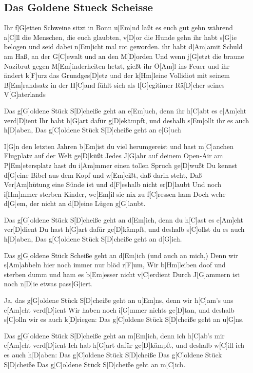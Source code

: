 \subsection*{Das Goldene Stueck Scheisse   }
\begin{guitar}
Ihr f[G]etten Schweine sitzt in Bonn u[Em]nd laßt es euch gut gehn
während a[C]ll die Menschen, die euch glaubten, v[D]or die Hunde gehn
ihr habt s[G]ie belogen und seid dabei n[Em]icht mal rot geworden.
ihr habt d[Am]amit Schuld am Haß, an der G[C]ewalt und an den M[D]orden
Und wenn j[G]etzt die braune Nazibrut gegen M[Em]inderheiten hetzt,
gießt ihr \"O[Am]l ins Feuer und ihr \"andert k[F]urz das Grundges[D]etz
und der k[Hm]leine Vollidiot mit seinem B[Em]randsatz in der H[C]and
fühlt sich als l[G]egitimer R\"a[D]cher seines V[G]aterlands

Das g[G]oldene St\"uck S[D]cheiße geht an e[Em]uch, denn ihr h[C]abt es e[Am]cht verd[D]ient
Ihr habt h[G]art dafür g[D]ek\"ampft, und deshalb s[Em]ollt ihr es auch h[D]aben,
Das g[C]oldene St\"uck S[D]cheiße geht an e[G]uch

I[G]n den letzten Jahren b[Em]ist du viel herumgereist
und hast m[C]anchen Flugplatz auf der Welt ge[D]k\"ußt
Jedes J[G]ahr auf deinem Open-Air am P[Em]etersplatz
hast du i[Am]mmer einen tollen Spruch ge[D]wußt
Du kennst d[G]eine Bibel aus dem Kopf und w[Em]eißt, daß darin steht,
Daß Ver[Am]h\"utung eine Sünde ist und d[F]eshalb nicht er[D]laubt
Und noch i[Hm]mmer sterben Kinder, we[Em]il sie nix zu f[C]ressen ham
Doch wehe d[G]em, der nicht an d[D]eine L\"ugen g[G]laubt.


Das g[G]oldene St\"uck S[D]cheiße geht an d[Em]ich, denn du h[C]ast es e[Am]cht ver[D]dient
Du hast h[G]art daf\"ur ge[D]k\"ampft, und deshalb s[C]ollst du es auch h[D]aben,
Das g[C]oldene St\"uck S[D]cheiße geht an d[G]ich.

Das g[G]oldene St\"uck Scheiße geht an d[Em]ich (und auch an mich,)
Denn wir s[Am]abbeln hier noch immer nur bl\"od r[F]um,\qquad[D]{}
Wir b[Hm]leiben doof und sterben dumm und ham es b[Em]esser nicht v[C]erdient
Durch J[G]ammern ist noch n[D]ie etwas pass[G]iert.

Ja, das g[G]oldene St\"uck S[D]cheiße geht an u[Em]ns, denn wir h[C]am's uns e[Am]cht verd[D]ient
Wir haben noch i[G]mmer nichts ge[D]tan, und deshalb s[C]olln wir es auch k[D]riegen:
Das g[C]oldene St\"uck S[D]cheiße geht an u[G]ns.

Das g[G]oldene St\"uck S[D]cheiße geht an m[Em]ich, denn ich h[C]ab's mir e[Am]cht verd[D]ient
Ich hab h[G]art dafür ge[D]k\"ampft, und deshalb w[C]ill ich es auch h[D]aben:
Das g[C]oldene St\"uck S[D]cheiße
Das g[C]oldene St\"uck S[D]cheiße
Das g[C]oldene St\"uck S[D]cheiße geht an m[C]ich.\qquad[G]{}
\end{guitar}
